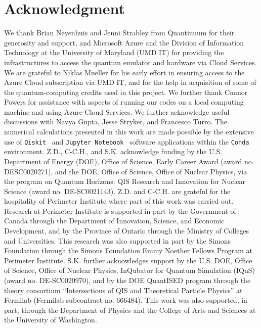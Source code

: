 \documentclass[a4paper,onecolumn,11pt,accepted=2024-10-11]{quantumarticle}
\begin{document}
\section*{Acknowledgment}
\noindent
We thank Brian Neyenhuis and Jenni Strabley from Quantinuum for their generosity and support, and Microsoft Azure and the Division of Information Technology at the University of Maryland (UMD IT) for providing the infrastructures to access the quantum emulator and hardware via Cloud Services.
We are grateful to Niklas Mueller for his early effort in ensuring access to the Azure Cloud subscription via UMD IT, and for the help in acquisition of some of the quantum-computing credits used in this project. We further thank Connor Powers for assistance with aspects of running our codes on a local computing machine and using Azure Cloud Services. We further acknowledge useful discussions with Navya Gupta, Jesse Stryker, and Francesco Turro. The numerical calculations presented in this work are made possible by the extensive use of \texttt{Qiskit}~\cite{Qiskit} and \texttt{Jupyter Notebook}~\cite{kluyver2016jupyter} software applications within the \texttt{Conda}~\cite{conda} environment.
Z.D., C-C.H., and S.K. acknowledge funding by the U.S. Department of Energy (DOE), Office of Science, Early Career Award (award no. DESC0020271), and the DOE, Office of Science, Office of Nuclear Physics, via the program on Quantum
Horizons: QIS Research and Innovation for Nuclear Science (award no. DE-SC0021143). Z.D. and C-C.H. are grateful for the hospitality of Perimeter Institute where part of this work was carried out. Research
at Perimeter Institute is supported in part by the Government of Canada through the Department of
Innovation, Science, and Economic Development, and by the Province of Ontario through the Ministry of Colleges and Universities. This research was also supported in part by the Simons Foundation through the Simons Foundation Emmy Noether Fellows Program at Perimeter Institute. S.K. further acknowledges support by the U.S. DOE, Office of Science, Office of Nuclear Physics, InQubator for Quantum Simulation (IQuS) (award no. DE-SC0020970), and by the DOE QuantISED program through the theory consortium ``Intersections of QIS and Theoretical Particle Physics'' at Fermilab (Fermilab subcontract no. 666484).
This work was also supported, in part, through the Department of Physics and the College of Arts and Sciences at the University of Washington.
\end{document}
